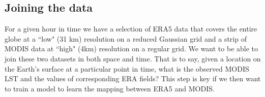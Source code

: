 \documentclass[twocolumn]{article}
\begin{document}
%


\subsection{Joining the data}\label{sec:join}
For a given hour in time we have a selection of ERA5 data that covers the entire globe at a ``low" (31 km) resolution on a reduced Gaussian grid and a strip of MODIS data at ``high" (4km) resolution on a regular grid. We want to be able to join these two datasets in both space and time. That is to say, given a location on the Earth's surface at a particular point in time, what is the observed MODIS LST and the values of corresponding ERA fields? This step is key if we then want to train a model to learn the mapping between ERA5 and MODIS. \newline 
\end{document}
